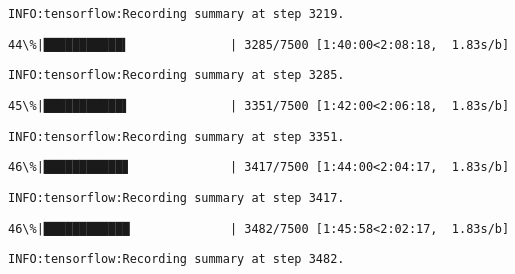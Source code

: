 \documentclass[11pt]{article}
\begin{document}
    \begin{Verbatim}[commandchars=\\\{\}]
INFO:tensorflow:Recording summary at step 3219.

    \end{Verbatim}

    \begin{Verbatim}[commandchars=\\\{\}]
 44\%|███████████▍              | 3285/7500 [1:40:00<2:08:18,  1.83s/b]
    \end{Verbatim}

    \begin{Verbatim}[commandchars=\\\{\}]
INFO:tensorflow:Recording summary at step 3285.

    \end{Verbatim}

    \begin{Verbatim}[commandchars=\\\{\}]
 45\%|███████████▌              | 3351/7500 [1:42:00<2:06:18,  1.83s/b]
    \end{Verbatim}

    \begin{Verbatim}[commandchars=\\\{\}]
INFO:tensorflow:Recording summary at step 3351.

    \end{Verbatim}

    \begin{Verbatim}[commandchars=\\\{\}]
 46\%|███████████▊              | 3417/7500 [1:44:00<2:04:17,  1.83s/b]
    \end{Verbatim}

    \begin{Verbatim}[commandchars=\\\{\}]
INFO:tensorflow:Recording summary at step 3417.

    \end{Verbatim}

    \begin{Verbatim}[commandchars=\\\{\}]
 46\%|████████████              | 3482/7500 [1:45:58<2:02:17,  1.83s/b]
    \end{Verbatim}

    \begin{Verbatim}[commandchars=\\\{\}]
INFO:tensorflow:Recording summary at step 3482.

    \end{Verbatim}
\end{document}
